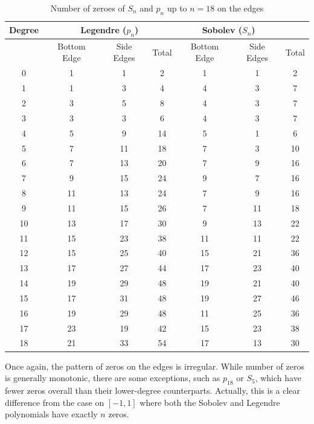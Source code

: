 \documentclass[12pt]{amsart}
\theoremstyle{plain}
\theoremstyle{definition}
\begin{document}
\begin{table}[H]
\centering
\caption{Number of zeroes of $S_n$ and $p_n$ up to $n=18$ on the edges}
\begin{tabular}{*7c}
\toprule
Degree &  \multicolumn{3}{c}{Legendre ($p_n$)} & \multicolumn{2}{c}{Sobolev ($S_n$)}\\
\midrule
 {}& Bottom Edge & Side Edges & Total & Bottom Edge & Side Edges & Total \\
	0 & 1 & 1 & 2 & 1 & 1 & 2 \\ 
	1 & 1 & 3 & 4 & 4 & 3 & 7 \\ 
	2 & 3 & 5 & 8 & 4 & 3 & 7 \\
	3 & 3 & 3 & 6 & 4 & 3 & 7 \\  
	4 & 5 & 9 & 14 & 5 & 1 & 6 \\  
	5 & 7 & 11 & 18 & 7 & 3 & 10 \\  
	6 & 7 & 13 & 20 & 7 & 9 & 16 \\  
	7 & 9 & 15 & 24 & 9 & 7 & 16 \\  
	8 & 11 & 13 & 24 & 7 & 9 & 16 \\  
	9 & 11 & 15 & 26 & 7 & 11 & 18 \\  
	10 & 13 & 17 & 30 & 9 & 13 & 22 \\  
	11 & 15 & 23 & 38 & 11 & 11 & 22 \\  
	12 & 15 & 25 & 40 & 15 & 21 & 36 \\  
	13 & 17 & 27 & 44 & 17 & 23 & 40 \\  
	14 & 19 & 29 & 48 & 19 & 21 & 40 \\  
	15 & 17 & 31 & 48 & 19 & 27 & 46 \\  
	16 & 19 & 29 & 48 & 11 & 25 & 36 \\  
	17 & 23 & 19 & 42 & 15 & 23 & 38 \\  
	18 & 21 & 33 & 54 & 17 & 13 & 30 \\  
\bottomrule
\end{tabular}
\label{table: antisymmetric zeroes}
\end{table}

Once again, the pattern of zeros on the edges is irregular. While number of zeros is generally monotonic, there are some exceptions, such as $p_{18}$ or $S_5$, which have fewer zeros overall than their lower-degree counterparts. Actually, this is a clear difference from the case on $[-1,1]$ where both the Sobolev and Legendre polynomials have exactly $n$ zeros. 
\end{document}
